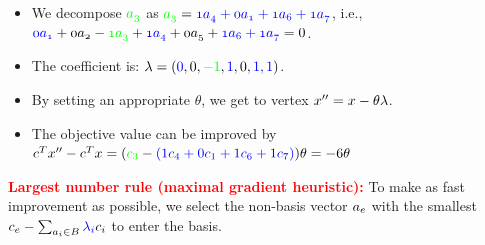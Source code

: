 \documentclass[mathserif]{beamer}
\begin{document}
{ \begin{itemize}
 \item We decompose  $\textcolor{green}{\mathnormal{a_3}}$ as  $\mathnormal{ \textcolor{green}{a_{3}} = \textcolor{blue}{1 a_{4} + 0 a_{1} + 1 a_{6} + 1 a_{7}}} $, i.e., 
 $\mathnormal{ \textcolor{blue}{0 a_{1}} + 0 a_{2}  - \textcolor{green}{1a_{3}}  + \textcolor{blue}{1 a_{4}} + 0 a_{5} + \textcolor{blue}{1a_{6} + 1 a_{7}}} = 0$. 
   \item The coefficient is: $\lambda=(\textcolor{blue}{0}, 0, \textcolor{green}{-1},  \textcolor{blue}{1}, 0, \textcolor{blue}{1, 1})$.
  \item By setting an appropriate $\theta$, we get to vertex $\mathnormal{x{''}=x}-\theta \lambda$. 
  \item The objective value can be improved by $\mathnormal{c^Tx{''}-c^Tx}=( \textcolor{green}{c_3} - \textcolor{blue}{(1c_4 + 0c_1 + 1c_6 + 1c_7)} ) \theta= -6\theta$
\end{itemize}

\textcolor{red}{\bf Largest number rule (maximal gradient heuristic):} To make as fast improvement as possible, we select the non-basis vector $\mathnormal{a}_e$ with the smallest $ c_e - \sum_{\mathnormal{a}_i\in \mathnormal{B}} \textcolor{blue}{\lambda_i} c_{i}$ to enter the basis. 
}



\end{document}
